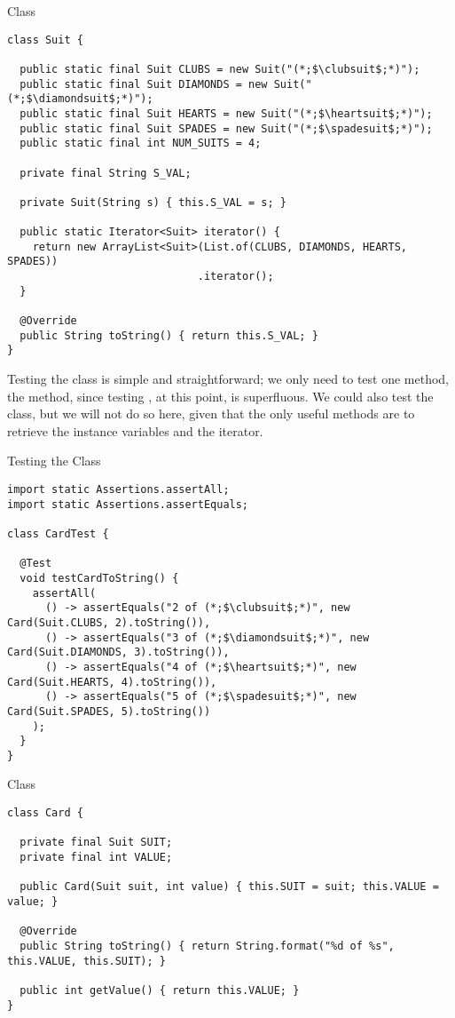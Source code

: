 \begin{cl}{ Class}
\begin{lstlisting}[language=MyJava]
class Suit {

  public static final Suit CLUBS = new Suit("(*;$\clubsuit$;*)");
  public static final Suit DIAMONDS = new Suit("(*;$\diamondsuit$;*)");
  public static final Suit HEARTS = new Suit("(*;$\heartsuit$;*)");
  public static final Suit SPADES = new Suit("(*;$\spadesuit$;*)");
  public static final int NUM_SUITS = 4;

  private final String S_VAL;

  private Suit(String s) { this.S_VAL = s; }

  public static Iterator<Suit> iterator() {
    return new ArrayList<Suit>(List.of(CLUBS, DIAMONDS, HEARTS, SPADES))
                              .iterator();
  }

  @Override
  public String toString() { return this.S_VAL; }
}
\end{lstlisting}
\end{cl}

Testing the  class is simple and straightforward; we only need to test one method, the  method, since testing , at this point, is superfluous. We could also test the  class, but we will not do so here, given that the only useful methods are to retrieve the instance variables and the iterator.

\begin{cl}{Testing the  Class}
\begin{lstlisting}[language=MyJava]
import static Assertions.assertAll;
import static Assertions.assertEquals;

class CardTest {

  @Test
  void testCardToString() {
    assertAll(
      () -> assertEquals("2 of (*;$\clubsuit$;*)", new Card(Suit.CLUBS, 2).toString()),
      () -> assertEquals("3 of (*;$\diamondsuit$;*)", new Card(Suit.DIAMONDS, 3).toString()),
      () -> assertEquals("4 of (*;$\heartsuit$;*)", new Card(Suit.HEARTS, 4).toString()),
      () -> assertEquals("5 of (*;$\spadesuit$;*)", new Card(Suit.SPADES, 5).toString())
    );
  }
}
\end{lstlisting}
\end{cl}

\begin{cl}{ Class}
\begin{lstlisting}[language=MyJava]
class Card {

  private final Suit SUIT;
  private final int VALUE;

  public Card(Suit suit, int value) { this.SUIT = suit; this.VALUE = value; }
  
  @Override
  public String toString() { return String.format("%d of %s", this.VALUE, this.SUIT); }

  public int getValue() { return this.VALUE; } 
}
\end{lstlisting}
\end{cl}

